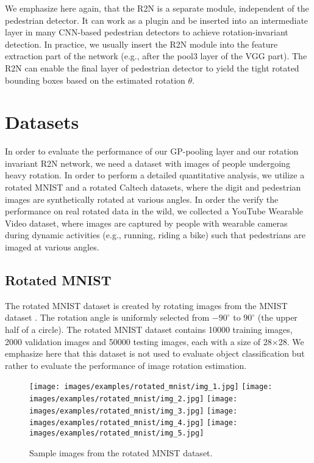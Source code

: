 \documentclass[10pt,twocolumn,letterpaper]{article}
\begin{document}
We emphasize here again, that the R2N is a separate module, independent of the pedestrian detector. It can work as a plugin and be inserted into an intermediate layer in many CNN-based pedestrian detectors to achieve rotation-invariant detection. In practice, we usually insert the R2N module into the feature extraction part of the network (e.g., after the pool3 layer of the VGG part). The R2N can enable the final layer of pedestrian detector to yield the tight rotated bounding boxes based on the estimated rotation $\theta$.


\section{Datasets}

In order to evaluate the performance of our GP-pooling layer and our rotation invariant R2N network, we need a dataset with images of people undergoing heavy rotation. In order to perform a detailed quantitative analysis, we utilize a rotated MNIST and a rotated Caltech datasets, where the digit and pedestrian images are synthetically rotated at various angles. In order the verify the performance on real rotated data in the wild, we collected a YouTube Wearable Video dataset, where images are captured by people with wearable cameras during dynamic activities (e.g., running, riding a bike) such that pedestrians are imaged at various angles.

\subsection{Rotated MNIST}

The rotated MNIST dataset is created by rotating images from the MNIST dataset \cite{Liu2003}. The rotation angle is uniformly selected from $-90^{\circ}$ to $90^{\circ}$ (the upper half of a circle). The rotated MNIST dataset contains 10000 training images, 2000 validation images and 50000 testing images, each with a size of 28$ \times $28. We emphasize here that this dataset is not used to evaluate object classification but rather to evaluate the performance of image rotation estimation.

\vspace{-0.2cm}
\begin{figure}[!h]
    \centering
    \texttt{[image: images/examples/rotated\_mnist/img\_1.jpg]}
    \texttt{[image: images/examples/rotated\_mnist/img\_2.jpg]}
    \texttt{[image: images/examples/rotated\_mnist/img\_3.jpg]}
    \texttt{[image: images/examples/rotated\_mnist/img\_4.jpg]}
    \texttt{[image: images/examples/rotated\_mnist/img\_5.jpg]}
    \caption{Sample images from the rotated MNIST dataset.}
    \label{fig:rotated_mnist_illustration}
    \vspace{-4mm}
\end{figure}
\end{document}

